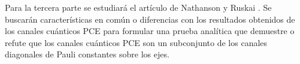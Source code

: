 Para la tercera parte se estudiará el artículo de Nathanson y Ruskai 
\cite{nathanson2007pauli}. Se buscarán características en común 
o diferencias con los resultados obtenidos de los canales cuánticos PCE
para formular una prueba analítica que demuestre o refute que los 
canales cuánticos PCE son un subconjunto de los canales diagonales 
de Pauli constantes sobre los ejes.

%
%
%
% 
% 
